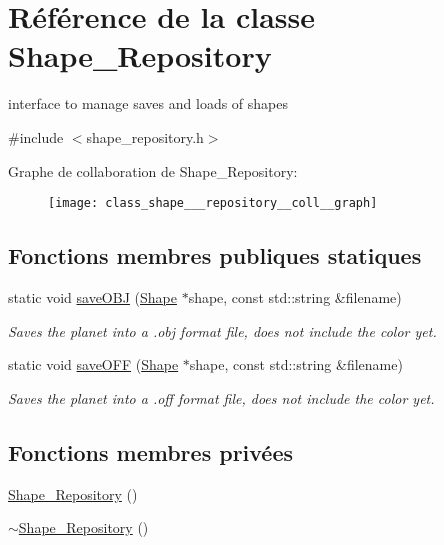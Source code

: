 \hypertarget{class_shape___repository}{}\section{Référence de la classe Shape\+\_\+\+Repository}
\label{class_shape___repository}


interface to manage saves and loads of shapes  




{\ttfamily \#include $<$shape\+\_\+repository.\+h$>$}



Graphe de collaboration de Shape\+\_\+\+Repository\+:
\nopagebreak
\begin{figure}[H]
\begin{center}
\leavevmode
\texttt{[image: class\_shape\_\_\_repository\_\_coll\_\_graph]}
\end{center}
\end{figure}
\subsection*{Fonctions membres publiques statiques}
\begin{DoxyCompactItemize}
\item 
static void \hyperlink{class_shape___repository_a0a0e36f8beab55be3c88e08c823819cd}{save\+O\+BJ} (\hyperlink{class_shape}{Shape} $\ast$shape, const std\+::string \&filename)
\begin{DoxyCompactList}\small\item\em Saves the planet into a .obj format file, does not include the color yet. \end{DoxyCompactList}\item 
static void \hyperlink{class_shape___repository_ad52141b6883d20084a0105355f2271b5}{save\+O\+FF} (\hyperlink{class_shape}{Shape} $\ast$shape, const std\+::string \&filename)
\begin{DoxyCompactList}\small\item\em Saves the planet into a .off format file, does not include the color yet. \end{DoxyCompactList}\end{DoxyCompactItemize}
\subsection*{Fonctions membres privées}
\begin{DoxyCompactItemize}
\item 
\hyperlink{class_shape___repository_ad2181017a4b9b4e0aafc16c8765a07ce}{Shape\+\_\+\+Repository} ()
\item 
\hyperlink{class_shape___repository_a446ee87301c8318b9fbd9e46ec54b0df}{$\sim$\+Shape\+\_\+\+Repository} ()
\end{DoxyCompactItemize}


